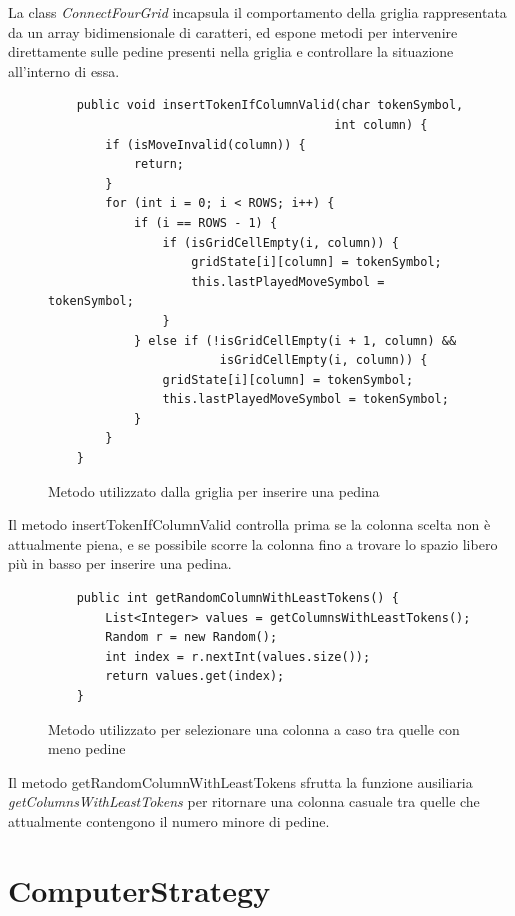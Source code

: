 La class \textit{ConnectFourGrid} incapsula il comportamento della griglia rappresentata da un array bidimensionale
di caratteri, ed espone metodi per intervenire direttamente sulle pedine presenti nella griglia e controllare la
situazione all'interno di essa. \\

\begin{figure}
    \begin{verbatim}
    public void insertTokenIfColumnValid(char tokenSymbol,
                                        int column) {
        if (isMoveInvalid(column)) {
            return;
        }
        for (int i = 0; i < ROWS; i++) {
            if (i == ROWS - 1) {
                if (isGridCellEmpty(i, column)) {
                    gridState[i][column] = tokenSymbol;
                    this.lastPlayedMoveSymbol = tokenSymbol;
                }
            } else if (!isGridCellEmpty(i + 1, column) &&
                        isGridCellEmpty(i, column)) {
                gridState[i][column] = tokenSymbol;
                this.lastPlayedMoveSymbol = tokenSymbol;
            }
        }
    }
    \end{verbatim}
    \caption{Metodo utilizzato dalla griglia per inserire una pedina}
    \label{fig:code-grid1}
\end{figure}

Il metodo insertTokenIfColumnValid controlla prima se la colonna scelta non è attualmente piena, e se possibile
scorre la colonna fino a trovare lo spazio libero più in basso per inserire una pedina.

\begin{figure}
    \begin{verbatim}
    public int getRandomColumnWithLeastTokens() {
        List<Integer> values = getColumnsWithLeastTokens();
        Random r = new Random();
        int index = r.nextInt(values.size());
        return values.get(index);
    }
    \end{verbatim}
    \caption{Metodo utilizzato per selezionare una colonna a caso tra quelle con meno pedine}
    \label{fig:code-grid2}
\end{figure}


Il metodo getRandomColumnWithLeastTokens sfrutta la funzione ausiliaria \textit{getColumnsWithLeastTokens} per
ritornare una colonna casuale tra quelle che attualmente contengono il numero minore di pedine.

\newpage
\section{ComputerStrategy}\label{sec:computerstrategy}

